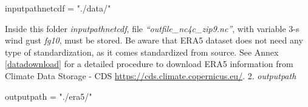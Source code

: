 \documentclass[12pt,oneside]{reedthesis}
\newenvironment{Shaded}{\begin{snugshade}}{\end{snugshade}}
\newcommand{\NormalTok}[1]{#1}
\newcommand{\StringTok}[1]{\textcolor[rgb]{0.31,0.60,0.02}{#1}}
\begin{document}
\vspace{0.4cm}
\begin{Shaded}
\begin{Highlighting}[]
\NormalTok{      inputpathnetcdf =}\StringTok{ "./data/"}
\end{Highlighting}
\end{Shaded}
\normalsize

Inside this folder \emph{inputpathnetcdf}, file \emph{``outfile\_nc4c\_zip9.nc''}, with variable 3-s wind gust \emph{fg10}, must be stored. Be aware that ERA5 dataset does not need any type of standardization, as it comes standardized from source. See Annex \ref{datadownload} for a detailed procedure to download ERA5 information from Climate Data Storage - CDS \url{https://cds.climate.copernicus.eu/}.
2. \emph{outputpath}

\scriptsize

\vspace{0.4cm}
\begin{Shaded}
\begin{Highlighting}[]
\NormalTok{      outputpath =}\StringTok{ "./era5/"}
\end{Highlighting}
\end{Shaded}
\normalsize
\end{document}
